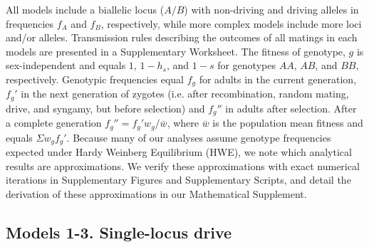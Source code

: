 \documentclass[12pt,letterpaper]{article}
\newcommand{\gc}[1]{{ \color{red} #1}}
\newcommand{\yb}[1]{{ \color{blue} #1}}
\begin{document}
All models include a biallelic locus ($A/B$) with non-driving and driving alleles in frequencies $f_A$ and $f_B$, 
	respectively, while more complex models include more loci and/or alleles.  
Transmission rules describing the outcomes of all matings in each
	models are presented in a Supplementary Worksheet. 
The fitness of genotype, $g$ is sex-independent and equals $1$, $1-h_s$, and $1-s$ for genotypes $AA$, $AB$, and $BB$, respectively. %
Genotypic frequencies  equal  $f_g$ for adults in the current generation, 
	$f_g'$ in the next generation of zygotes (i.e. after recombination, random mating, drive, and syngamy, but before selection)
	and $f_g''$ in adults after selection. 
After a complete generation $f_g'' = f_g' w_g/\bar{w}$, where $\bar{w}$ is the population mean fitness and equals $\Sigma w_g f_g'$. 
Because many of our analyses assume genotype frequencies expected under Hardy Weinberg Equilibrium (HWE), we note which analytical results are approximations. 
We verify these approximations with exact numerical iterations in Supplementary Figures and Supplementary Scripts, and detail the derivation of these approximations in our Mathematical Supplement. 



\subsection*{Models 1-3. Single-locus drive}
\end{document}
